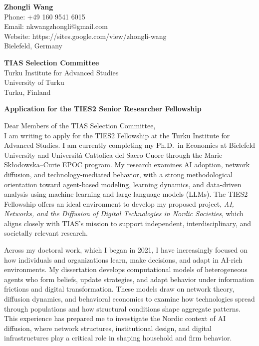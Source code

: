 \documentclass[11pt]{article}
\begin{document}
\noindent
\textbf{Zhongli Wang} \\
Phone: +49 160 9541 6015 \\
Email: nkwangzhongli@gmail.com \\
Website: https://sites.google.com/view/zhongli-wang \\
Bielefeld, Germany \\

\vspace{0.5cm}

\noindent
\textbf{TIAS Selection Committee} \\
Turku Institute for Advanced Studies \\
University of Turku \\
Turku, Finland \\

\vspace{0.5cm}

\noindent
\textbf{Application for the TIES2 Senior Researcher Fellowship} \\

\vspace{0.3cm}

\noindent Dear Members of the TIAS Selection Committee,\\[0.2cm]

I am writing to apply for the TIES2 Fellowship at the Turku Institute for Advanced Studies. 
I am currently completing my Ph.D.\ in Economics at Bielefeld University and Università Cattolica del Sacro Cuore through the Marie Skłodowska–Curie EPOC program. 
My research examines AI adoption, network diffusion, and technology-mediated behavior, with a strong methodological orientation toward agent-based modeling, learning dynamics, and data-driven analysis using machine learning and large language models (LLMs). 
The TIES2 Fellowship offers an ideal environment to develop my proposed project, \emph{AI, Networks, and the Diffusion of Digital Technologies in Nordic Societies}, which aligns closely with TIAS’s mission to support independent, interdisciplinary, and societally relevant research.

Across my doctoral work, which I began in 2021, I have increasingly focused on how individuals and organizations learn, make decisions, and adapt in AI-rich environments.  
My dissertation develops computational models of heterogeneous agents who form beliefs, update strategies, and adapt behavior under information frictions and digital transformation.  
These models draw on network theory, diffusion dynamics, and behavioral economics to examine how technologies spread through populations and how structural conditions shape aggregate patterns.  
This experience has prepared me to investigate the Nordic context of AI diffusion, where network structures, institutional design, and digital infrastructures play a critical role in shaping household and firm behavior.
\end{document}
